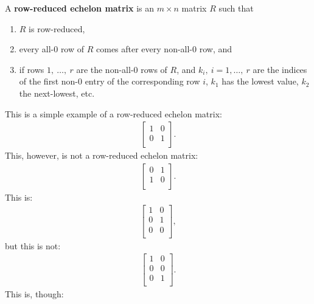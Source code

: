 \documentclass[12pt]{article}
\begin{document}
\begin{defn}
  A \textbf{row-reduced echelon matrix} is an $m \times n$ matrix
  $R$ such that
  \begin{enumerate}
      \item
        $R$ is row-reduced,
      \item
        every all-0 row of $R$ comes after every non-all-0 row,
        and
      \item
        if rows $1,\ \ldots,\ r$ are the non-all-0 rows of $R$,
        and $k_i,\ i = 1, \ldots,\ r$ are the indices of the
        first non-0 entry of the corresponding row $i$, $k_1$ has
        the lowest value, $k_2$ the next-lowest, etc.
  \end{enumerate}

  \begin{exm}
    This is a simple example of a row-reduced echelon matrix:
    \begin{align*}
      \begin{bmatrix}
        1 & 0\\
        0 & 1\\
      \end{bmatrix}.
    \end{align*}
    This, however, is not a row-reduced echelon matrix:
    \begin{align*}
      \begin{bmatrix}
        0 & 1\\
        1 & 0\\
      \end{bmatrix}.
    \end{align*}
    This is:
    \begin{align*}
      \begin{bmatrix}
        1 & 0\\
        0 & 1\\
        0 & 0\\
      \end{bmatrix},
    \end{align*}
    but this is not:
    \begin{align*}
      \begin{bmatrix}
        1 & 0\\
        0 & 0\\
        0 & 1\\
      \end{bmatrix}.
    \end{align*}
    This is, though:
    \begin{align*}

\end{align*}
\end{exm}
\end{defn}
\end{document}

